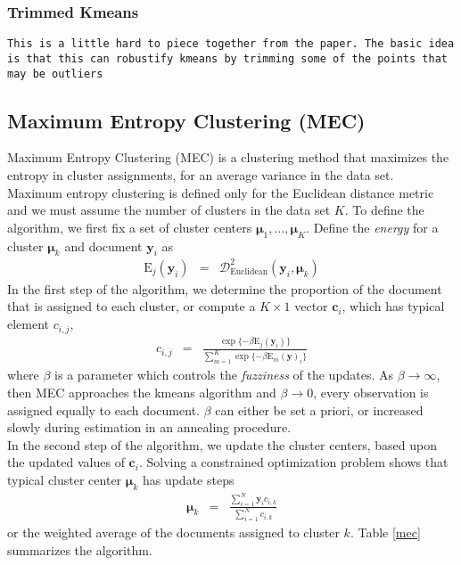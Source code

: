 \documentclass[11pt,letterpaper]{article}
\numberwithin{equation}{section}
\begin{document}
\subsubsection{Trimmed Kmeans}
{\tt This is a little hard to piece together from the paper.  The
basic idea is that this can robustify kmeans by trimming some of the
points that may be outliers}

\subsection{Maximum Entropy Clustering (MEC)}
Maximum Entropy Clustering (MEC) is a clustering method that
maximizes the entropy in cluster assignments, for an average
variance in the data set.  \\
\indent Maximum entropy clustering is defined only for the Euclidean
distance metric and we must assume the number of clusters in the
data set $K$.  To define the algorithm, we first fix a set of
cluster centers $\boldsymbol{\mu}_1, \hdots, \boldsymbol{\mu}_K$.
 Define the \emph{energy} for a cluster $\boldsymbol{\mu}_k$ and
document $\boldsymbol{y}_i$ as
\begin{eqnarray}
\text{E}_j(\boldsymbol{y}_i) & = &
\mathcal{D}^2_{\text{Euclidean}}(\boldsymbol{y}_i,
\boldsymbol{\mu}_k) \nonumber
\end{eqnarray}
In the first step of the algorithm, we determine the proportion of
the document that is assigned to each cluster, or compute a $K
\times 1$ vector $\boldsymbol{c}_i$, which has typical element
$c_{i,j}$,
\begin{eqnarray}
c_{i,j} & = & \frac{\exp\{- \beta \text{E}_j(\boldsymbol{y}_i)
\}}{\sum_{m=1}^{K} \exp\{ - \beta \text{E}_m(\boldsymbol{y})_i\}}
\end{eqnarray}
where $\beta$ is a parameter which controls the \emph{fuzziness} of
the updates.  As $\beta \rightarrow \infty$, then MEC approaches the
kmeans algorithm and $\beta \rightarrow 0$, every observation is
assigned equally to each document. $\beta$ can either be set a priori, or increased slowly during
estimation in an annealing procedure.   \\
\indent In the second step of the algorithm, we update the cluster
centers, based upon the updated values of $\boldsymbol{c}_i$.
Solving a constrained optimization problem shows that typical
cluster center $\boldsymbol{\mu}_k$ has update steps
\begin{eqnarray}
\boldsymbol{\mu}_k & = & \frac{\sum_{i=1}^{N} \boldsymbol{y}_i
c_{i,k} }{ \sum_{i=1}^{N} c_{i,k} } \nonumber
\end{eqnarray}
or the weighted average of the documents assigned to cluster $k$.
Table \ref{mec} summarizes the algorithm.
\end{document}
